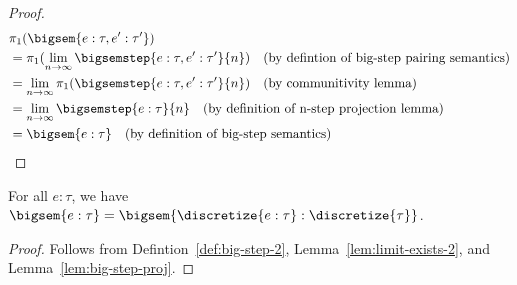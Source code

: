 \begin{proof}
	\begin{align*}
		&\pi_1(\bigsem{e : \tau, e' : \tau'}) \\
		&= \pi_1(\lim_{n \to \infty} \bigsemstep{e : \tau, e' : \tau'}{n}) \quad \text{(by defintion of big-step pairing semantics)} \\
		&= \lim_{n \to \infty} \pi_1(\bigsemstep{e : \tau, e' : \tau'}{n}) \quad \text{(by communitivity lemma)} \\
		&= \lim_{n \to \infty} \bigsemstep{e : \tau}{n} \quad \text{(by definition of n-step projection lemma)} \\
		&= \bigsem{e : \tau} \quad \text{(by definition of big-step semantics)}
	\end{align*}
\end{proof}

\begin{theorem}
	For all $e : \tau$, we have $\bigsem{e : \tau} = \bigsem{\discretize{e : \tau} : \discretize{\tau}}$.
\end{theorem}

\begin{proof}
	Follows from Defintion~\ref{def:big-step-2}, Lemma~\ref{lem:limit-exists-2}, and Lemma~\ref{lem:big-step-proj}.
\end{proof}
